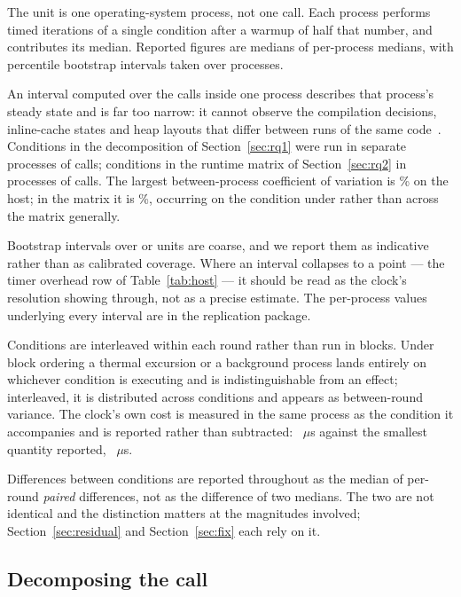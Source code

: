 \documentclass[pdflatex,sn-basic,twocolumn]{sn-jnl}%
\begin{document}
The unit is one operating-system process, not one call. Each process performs
\HostCallsPerInvocation{} timed iterations of a single condition after a warmup
of half that number, and contributes its median. Reported figures are medians of
per-process medians, with percentile bootstrap intervals taken over processes.

An interval computed over the calls inside one process describes that process's
steady state and is far too narrow: it cannot observe the compilation decisions,
inline-cache states and heap layouts that differ between runs of the same
code~\citep{georges2007statistically}. Conditions in the decomposition of
Section~\ref{sec:rq1} were run in \HostInvocations{} separate processes of
\HostCallsPerInvocation{} calls; conditions in the runtime matrix of
Section~\ref{sec:rq2} in \MatrixInvocations{} processes of
\MatrixCallsPerInvocation{} calls. The largest between-process coefficient of
variation is \HostCvMax\% on the host; in the matrix it is \MatrixCvMax\%,
occurring on the \texttt{\MatrixCvMaxCondition} condition under
\texttt{\MatrixCvMaxEnvironment} rather than across the matrix generally.

Bootstrap intervals over \HostInvocations{} or \MatrixInvocations{} units are
coarse, and we report them as indicative rather than as calibrated coverage.
Where an interval collapses to a point --- the timer overhead row of
Table~\ref{tab:host} --- it should be read as the clock's resolution showing
through, not as a precise estimate. The per-process values underlying every
interval are in the replication package.

Conditions are interleaved within each round rather than run in blocks. Under
block ordering a thermal excursion or a background process lands entirely on
whichever condition is executing and is indistinguishable from an effect;
interleaved, it is distributed across conditions and appears as between-round
variance. The clock's own cost is measured in the same process as the condition
it accompanies and is reported rather than subtracted: \HostTimerOverhead~$\mu$s
against the smallest quantity reported, \HostCreateSecretKey~$\mu$s.

Differences between conditions are reported throughout as the median of
per-round \emph{paired} differences, not as the difference of two medians. The
two are not identical and the distinction matters at the magnitudes involved;
Section~\ref{sec:residual} and Section~\ref{sec:fix} each rely on it.

\subsection{Decomposing the call}\label{sec:decompose}
\end{document}
